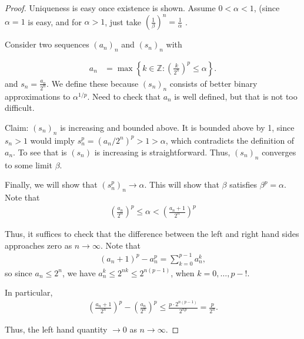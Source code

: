 \documentclass[12pt]{article}
\begin{document}
  \begin{proof}
    Uniqueness is easy once existence is shown.  Assume $0 < \alpha < 1$, (since $\alpha = 1$ is easy, and for $\alpha > 1$, just take $\left( \frac{1}{\beta} \right)^n = \frac{1}{\alpha}$ .

      Consider two sequences $(a_n)_n$ and $(s_n)_n$ with

      \begin{align*}
        a_n &= \max \left\{ k \in \mathbb{Z}: \left( \frac{k}{2^n} \right)^p \leq \alpha \right\}.
      \end{align*}
      and $s_n = \frac{a_n}{2^n}$.  We define these because $(s_n)_n$ consists of better binary approximations to $\alpha^{1/p}$.  Need to check that $a_n$ is well defined, but that is not too difficult.

      Claim: $(s_n)_n$ is increasing and bounded above. It is bounded above by 1, since $s_n > 1$ would imply $s_n^p = (a_n / 2^n)^{p} > 1 > \alpha$, which contradicts the definition of $a_n$.  To see that is $(s_n)$ is increasing is straightforward.  Thus, $(s_n)_n$ converges to some limit $\beta$.

      Finally, we will show that $(s_n^p)_n \to \alpha$.  This will show that $\beta$ satisfies $\beta^{p} = \alpha$.  Note that
      \begin{align*}
        \left( \frac{a_n}{2^n} \right)^p \leq \alpha < \left( \frac{a_n+1}{2^n} \right)^{p}
      \end{align*}

      Thus, it suffices to check that the difference between the left and right hand sides approaches zero as $n \to \infty$.  Note that
      \begin{align*}
        (a_n + 1)^{p} - a_n^p = \sum_{k=0}^{p-1} a_n^k,
      \end{align*}
      so since $a_n \leq 2^n$, we have $a_n^k \leq 2^{nk} \leq 2^{n(p-1)}$, when $k = 0, \dots, p-!$.

      In particular,
      \begin{align*}
        \left( \frac{a_n+1}{2^n} \right)^p - \left( \frac{a_n}{2^n} \right)^p \leq \frac{p \cdot 2^{n(p-1)}}{2^{np}} = \frac{p}{2^n}.
      \end{align*}

      Thus, the left hand quantity $\to 0$ as $n \to \infty$.
  \end{proof}
\end{document}
